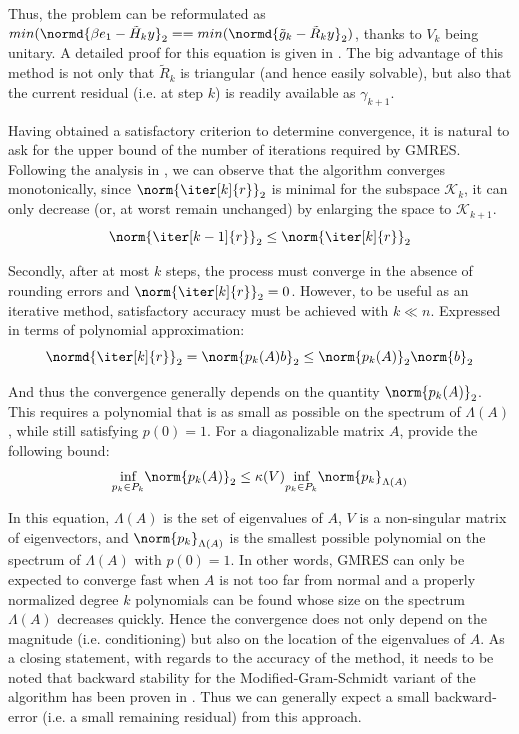\noindent Thus, the problem can be reformulated as $min(\normd{\beta e_1 -\tilde{H}_ky}_2==min(\normd{\tilde{g}_k -\tilde{R}_ky}_2)$, thanks to $V_k$ being unitary. A detailed proof for this equation is given in \cite{saad_iterative_2003}. The big advantage of this method is not only that $\tilde{R}_k$ is triangular (and hence easily solvable), but also that the current residual (i.e. at step $k$) is readily available as $\gamma_{k+1}$.

Having obtained a satisfactory criterion to determine convergence, it is natural to ask for the upper bound of the number of iterations required by GMRES. Following the analysis in \cite{trefethen_numerical_1997}, we can observe that the algorithm converges monotonically, since $\norm{\iter[k]{r}}_2$ is minimal for the subspace $\mathcal{K}_k$, it can only decrease (or, at worst remain unchanged) by enlarging the space to $\mathcal{K}_{k+1}$.
\begin{equation}
    \norm{\iter[k-1]{r}}_2\leq \norm{\iter[k]{r}}_2
\end{equation}

\noindent Secondly, after at most $k$ steps, the process must converge in the absence of rounding errors and $\norm{\iter[k]{r}}_2 = 0$. However, to be useful as an iterative method, satisfactory accuracy must be achieved with  $k \ll n$. Expressed in terms of polynomial approximation: 
\begin{equation}
    \normd{\iter[k]{r}}_2=\norm{p_k(A)b}_2 \leq \norm{p_k(A)}_2\norm{b}_2
\end{equation}

\noindent And thus the convergence generally depends on the quantity $\norm{p_k(A)}_2$. This requires a polynomial that is as small as possible on the spectrum of $\Lambda(A)$, while still satisfying $p(0)=1$. For a diagonalizable matrix $A$, \cite{trefethen_numerical_1997} provide the following bound:
\begin{equation}
    \underset{p_k \in P_k}{\text{inf}} \norm{p_k(A)}_2 \leq \kappa(V) \underset{p_k \in P_k}{\text{inf}} \norm{p_k}_{\Lambda(A)}
\end{equation}

\noindent In this equation, $\Lambda(A)$ is the set of eigenvalues of $A$, $V$ is a non-singular matrix of eigenvectors, and $\norm{p_k}_{\Lambda(A)}$ is the smallest possible polynomial on the spectrum of $\Lambda(A)$ with $p(0)=1$. In other words, GMRES can only be expected to converge fast when $A$ is not too far from normal and a properly normalized degree $k$ polynomials can be found whose size on the spectrum $\Lambda(A)$ decreases quickly. Hence the convergence does not only depend on the magnitude (i.e. conditioning) but also on the location of the eigenvalues of $A$.
As a closing statement, with regards to the accuracy of the method, it needs to be noted that backward stability for the Modified-Gram-Schmidt variant of the algorithm has been proven in \cite{paige_modified_2006}. Thus we can generally expect a small backward-error (i.e. a small remaining residual) from this approach. 


